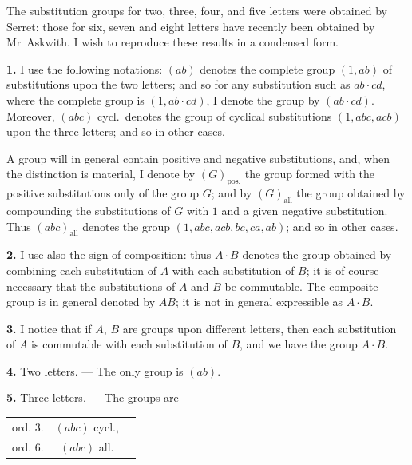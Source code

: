 \documentclass[11pt,a4paper]{book}
\begin{document}
\newpage
{}

The substitution groups for two, three, four, and five letters were obtained by Serret: those for six, seven and eight letters have recently been obtained by Mr~Askwith. I wish to reproduce these results in a condensed form.

\vspace{0.5em}
\textbf{1.} I use the following notations: $(ab)$ denotes the complete group $(1, ab)$ of substitutions upon the two letters; and so for any substitution such as $ab \cdot cd$, where the complete group is $(1, ab \cdot cd)$, I denote the group by $(ab \cdot cd)$. Moreover, $(abc)$ cycl.\ denotes the group of cyclical substitutions $(1, abc, acb)$ upon the three letters; and so in other cases.

A group will in general contain positive and negative substitutions, and, when the distinction is material, I denote by $(G)_{\text{pos.}}$ the group formed with the positive substitutions only of the group $G$; and by $(G)_{\text{all}}$ the group obtained by compounding the substitutions of $G$ with $1$ and a given negative substitution. Thus $(abc)_{\text{all}}$ denotes the group $(1, abc, acb, bc, ca, ab)$; and so in other cases.

\vspace{0.5em}
\textbf{2.} I use also the sign of composition: thus $A \cdot B$ denotes the group obtained by combining each substitution of $A$ with each substitution of $B$; it is of course necessary that the substitutions of $A$ and $B$ be commutable. The composite group is in general denoted by $AB$; it is not in general expressible as $A \cdot B$.

\vspace{0.5em}
\textbf{3.} I notice that if $A$, $B$ are groups upon different letters, then each substitution of $A$ is commutable with each substitution of $B$, and we have the group $A \cdot B$.

\vspace{0.5em}
\textbf{4.} Two letters. --- The only group is $(ab)$.

\vspace{0.5em}
\textbf{5.} Three letters. --- The groups are
\begin{center}
\begin{tabular}{ccl}
ord.  3. & $(abc)$ cycl., \\
ord.  6. & $(abc)$ all.
\end{tabular}
\end{center}
\end{document}
